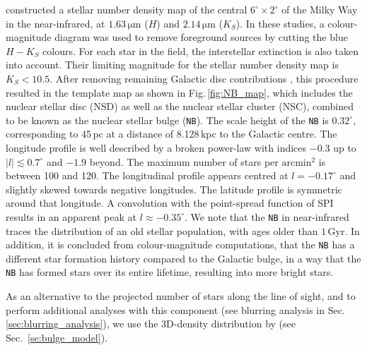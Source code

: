 \documentclass[doublespace,nopageskip]{VTthesis} %
\newcommand{\mrm}[1]{\mathrm{#1}}
\begin{document}
\citet{2013ApJ...769L..28N} constructed a stellar number density map of the central $6^{\circ} \times 2^{\circ}$ of the Milky Way in the near-infrared, at $1.63\,\mrm{\mu m}$ ($H$) and $2.14\,\mrm{\mu m}$ ($K_S$).
%
In these studies, a colour-magnitude diagram was used to remove foreground sources by cutting the blue $H-K_S$ colours.
%
For each star in the field, the interstellar extinction is also taken into account.
%
Their limiting magnitude for the stellar number density map is $K_S<10.5$.
%
After removing remaining Galactic disc contributions \citep{2018NatAs...2..387M}, this procedure resulted in the template map as shown in Fig.\,\ref{fig:NB_map}, which includes the nuclear stellar disc (NSD) as well as the nuclear stellar cluster (NSC), combined to be known as the nuclear stellar bulge (\texttt{NB}).
%
The scale height of the \texttt{NB} is $0.32^{\circ}$, corresponding to 45\,pc at a distance of 8.128\,kpc to the Galactic centre.
%
The longitude profile is well described by a broken power-law with indices $-0.3$ up to $|l| \lesssim 0.7^{\circ}$ and $-1.9$ beyond.
%
The maximum number of stars per $\mrm{arcmin^2}$ is between 100 and 120.
%
The longitudinal profile appears centred at $l=-0.17^{\circ}$ and slightly skewed towards negative longitudes.
%
The latitude profile is symmetric around that longitude.
%
A convolution with the point-spread function of SPI results in an apparent peak at $l \approx -0.35^{\circ}$.
%
We note that the \texttt{NB} in near-infrared traces the distribution of an old stellar population, with ages older than $1\,\mrm{Gyr}$.
%
In addition, it is concluded from colour-magnitude computations, that the \texttt{NB} has a different star formation history compared to the Galactic bulge, in a way that the \texttt{NB} has formed stars over its entire lifetime, resulting into more bright stars.

As an alternative to the projected number of stars along the line of sight, and to perform additional analyses with this component (see blurring analysis in Sec.\,\ref{sec:blurring_analysis}), we use the 3D-density distribution by \citet{2002A&A...384..112L} (see Sec.~\ref{se:bulge_model}).
%

\end{document}
